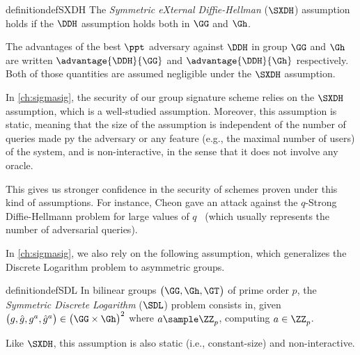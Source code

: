 \begin{restatable}{definition}{defSXDH}  \label{de:SXDH}
  The \emph{Symmetric eXternal Diffie-Hellman} ($\SXDH$) assumption holds if the $\DDH$ assumption holds both in $\GG$ and $\Gh$.
\end{restatable}

The advantages of the best $\ppt$ adversary against $\DDH$ in group $\GG$ and $\Gh$ are written $\advantage{\DDH}{\GG}$ and $\advantage{\DDH}{\Gh}$ respectively. Both of those quantities are assumed negligible under the $\SXDH$ assumption.

In \cref{ch:sigmasig}, the security of our group signature scheme relies on the $\SXDH$ assumption, which is a well-studied assumption.
Moreover, this assumption is static, meaning that the size of the assumption is independent of the number of queries made py the adversary or any feature (e.g., the maximal number of users) of the system, and is non-interactive, in the sense that it does not involve any oracle.

This gives us stronger confidence in the security of schemes proven under this kind of assumptions.
For instance, Cheon gave an attack against the  $q$-Strong Diffie-Hellmann problem for large values of $q$~\cite{Che06} (which usually represents the number of adversarial queries).

In \cref{ch:sigmasig}, we also rely on the following assumption, which generalizes the Discrete Logarithm problem to asymmetric groups.

\begin{restatable}[$\SDL$]{definition}{defSDL}
  \label{de:SDL} 
  In bilinear groups $\bigl(\GG,\Gh,\GT^{}\bigr)$  of  prime order $p$,  the \emph {Symmetric  Discrete Logarithm} ($\SDL$) problem  consists in, given
  $\bigl(g,\hat{g},g^a_{},\hat{g}^a_{}\bigr) \in \bigl(\GG \times \Gh\bigr)^2_{}$
  where $a \sample \ZZ_p^{}$, computing $a \in \ZZ_p^{}$.
\end{restatable}

Like $\SXDH$, this assumption is also static (i.e., constant-size) and non-interactive.
